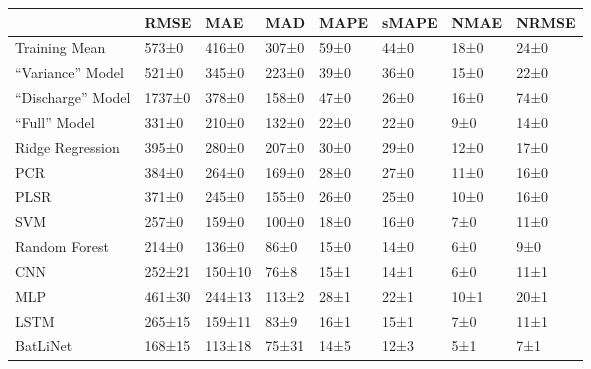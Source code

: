 \begin{tabular}{llllllll}
\toprule
 & RMSE & MAE & MAD & MAPE & sMAPE & NMAE & NRMSE \\
\midrule
Training Mean & 573±0 & 416±0 & 307±0 & 59±0 & 44±0 & 18±0 & 24±0 \\
``Variance'' Model & 521±0 & 345±0 & 223±0 & 39±0 & 36±0 & 15±0 & 22±0 \\
``Discharge'' Model & 1737±0 & 378±0 & 158±0 & 47±0 & 26±0 & 16±0 & 74±0 \\
``Full'' Model & 331±0 & 210±0 & 132±0 & 22±0 & 22±0 & 9±0 & 14±0 \\
Ridge Regression & 395±0 & 280±0 & 207±0 & 30±0 & 29±0 & 12±0 & 17±0 \\
PCR & 384±0 & 264±0 & 169±0 & 28±0 & 27±0 & 11±0 & 16±0 \\
PLSR & 371±0 & 245±0 & 155±0 & 26±0 & 25±0 & 10±0 & 16±0 \\
SVM & 257±0 & 159±0 & 100±0 & 18±0 & 16±0 & 7±0 & 11±0 \\
Random Forest & 214±0 & 136±0 & 86±0 & 15±0 & 14±0 & 6±0 & 9±0 \\
CNN & 252±21 & 150±10 & 76±8 & 15±1 & 14±1 & 6±0 & 11±1 \\
MLP & 461±30 & 244±13 & 113±2 & 28±1 & 22±1 & 10±1 & 20±1 \\
LSTM & 265±15 & 159±11 & 83±9 & 16±1 & 15±1 & 7±0 & 11±1 \\
BatLiNet & 168±15 & 113±18 & 75±31 & 14±5 & 12±3 & 5±1 & 7±1 \\
\bottomrule
\end{tabular}
